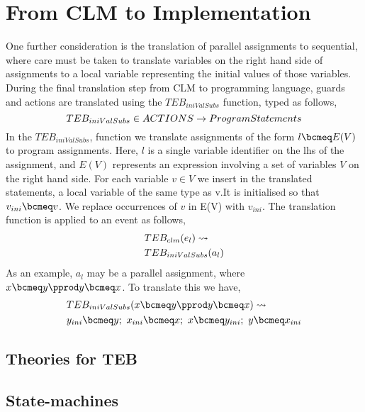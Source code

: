 \section{From CLM to Implementation}
One further consideration is the translation of parallel assignments to sequential, where care must be taken to translate variables on the right hand side of assignments to a local variable representing the initial values of those variables. During the final translation step from CLM to programming language, guards and actions are translated using the $TEB_{iniValSubs}$ function, typed as follows,
\begin{equation}
TEB_{iniValSubs} \in  ACTIONS \rightarrow ProgramStatements
\notag
\end{equation}
In the $TEB_{iniValSubs}$, function we translate assignments of the form $l \bcmeq E(V)$ to program assignments. Here, $l$ is a single variable identifier on the lhs of the assignment, and  $E(V)$ represents an expression involving a set of variables $V$ on the right hand side. For each variable $v \in V$ we insert in the translated statements, a local variable of the same type as v.It is initialised so that $v_{ini} \bcmeq v$. We replace occurrences of $v$ in E(V) with $v_{ini}$. The translation function is applied to an event as follows,
%
\begin{equation}
\begin{split}
&TEB_{clm}(e_l) \leadsto \\
&TEB_{iniValSubs}(a_l)
\end{split}
\notag
\end{equation}
%
As an example, $a_l$ may be a parallel assignment, where $x \bcmeq y \pprod y \bcmeq x$. To translate this we have,
%
\begin{equation}
\begin{split}
&TEB_{iniValSubs}(x \bcmeq y \pprod y \bcmeq x) \leadsto\\
&y_{ini} \bcmeq y;~ x_{ini} \bcmeq x;~ x \bcmeq y_{ini};~ y \bcmeq x_{ini}  
\end{split}
\notag
\end{equation}





\subsection{Theories for TEB}

\subsection{State-machines}